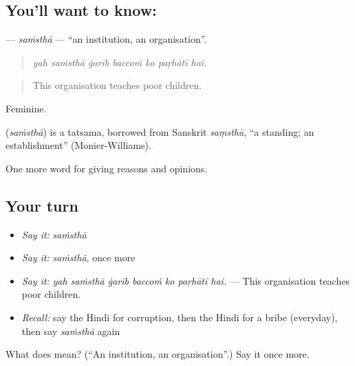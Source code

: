 \subsection*{You'll want to know: }
\textbf{} — \emph{saṁsthā} — \textquotedblleft{}an institution, an organisation\textquotedblright{}.

\begin{quote}
      
\end{quote}

\begin{quote}
\emph{yah saṁsthā ġarīb baccoṁ ko paṛhātī hai.}
\end{quote}

\begin{quote}
This organisation teaches poor children.
\end{quote}

Feminine.

\begin{cousinweb}
\textbf{} (\emph{saṁsthā}) is a tatsama, borrowed from Sanskrit \emph{saṃsthā}, \textquotedblleft{}a standing; an establishment\textquotedblright{} (Monier-Williams).
\end{cousinweb}

\begin{grammarlens}[title={What you've built}]
One more word for giving reasons and opinions.
\end{grammarlens}

\subsection*{Your turn}
\begin{itemize}
\raggedright
  \item \emph{Say it:} \emph{saṁsthā}
  \item \emph{Say it:} \emph{saṁsthā}, once more
  \item \emph{Say it:} \emph{yah saṁsthā ġarīb baccoṁ ko paṛhātī hai.} — This organisation teaches poor children.
  \item \emph{Recall:} say the Hindi for corruption, then the Hindi for a bribe (everyday), then say \emph{saṁsthā} again
\end{itemize}

\begin{tcolorbox}[breakable,colback=teal!4,colframe=teal!35!black,title={Before you move on}]
What does  mean? (\textquotedblleft{}An institution, an organisation\textquotedblright{}.) Say it once more.
\end{tcolorbox}
